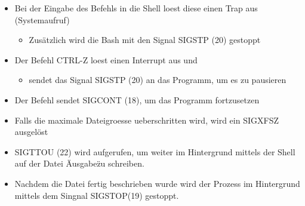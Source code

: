 
\begin{itemize}
    
    \item Bei der Eingabe des Befehls  in die Shell loest diese einen Trap aus (Systemaufruf) 
    \begin{itemize}
       \item Zusätzlich wird die Bash mit den Signal  SIGSTP (20) gestoppt
\end{itemize}  
    \item Der Befehl CTRL-Z loest einen Interrupt aus und
        \begin{itemize}
            \item sendet das Signal SIGSTP (20) an das Programm, um es zu pausieren
        \end{itemize}
    \item Der Befehl  sendet SIGCONT (18), um das Programm fortzusetzen
    \item Falls die maximale Dateigroesse ueberschritten wird, wird ein SIGXFSZ ausgelöst
    
    \item SIGTTOU (22) wird aufgerufen, um weiter im Hintergrund mittels der Shell auf der Datei \" Ausgabe\" zu schreiben.
    \item Nachdem die Datei fertig beschrieben wurde wird der Prozess im Hintergrund mittels dem Singnal SIGSTOP(19) gestoppt.
    
\end{itemize}
